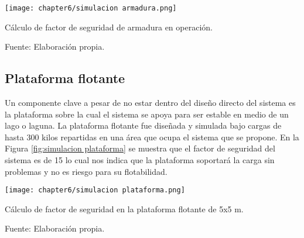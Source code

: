 \begin{myfigure}[H]
	\footnotesize\centering
	\texttt{[image: chapter6/simulacion armadura.png]}
	\caption{Cálculo de factor de seguridad de armadura en operación.}
	\begin{myflushcenter}
		Fuente: Elaboración propia.
	\end{myflushcenter}
	\label{fig:simulacion armadura}
\end{myfigure}


\subsection{Plataforma flotante}

Un componente clave a pesar de no estar dentro del diseño directo del sistema es la plataforma sobre la cual el sistema se apoya para ser estable en medio de un lago o laguna. La plataforma flotante fue diseñada y simulada bajo cargas de hasta 300 kilos repartidas en una área que ocupa el sistema que se propone. En la Figura \ref{fig:simulacion plataforma} se muestra que el factor de seguridad del sistema es de 15 lo cual nos indica que la plataforma soportará la carga sin problemas y no es riesgo para su flotabilidad.

\begin{myfigure}[H]
	\footnotesize\centering
	\texttt{[image: chapter6/simulacion plataforma.png]}
	\caption{Cálculo de factor de seguridad en la plataforma flotante de 5x5 m.}
	\begin{myflushcenter}
		Fuente: Elaboración propia.
	\end{myflushcenter}
	\label{fig:simulacion plataforma}
\end{myfigure}





